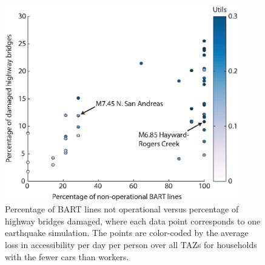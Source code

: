 





\begin{figure}[htb]
\centering
\includegraphics[width=4in]{FIGS/equity_bart_bridges_acc3vJWBv4.eps} 
\caption{Percentage of BART lines not operational versus percentage of highway bridges damaged, where each data point corresponds to one earthquake simulation. The points are color-coded by the average loss in accessibility per day per person over all TAZs for households with the fewer cars than workers.}
\label{fig:bartBri}
\end{figure}



